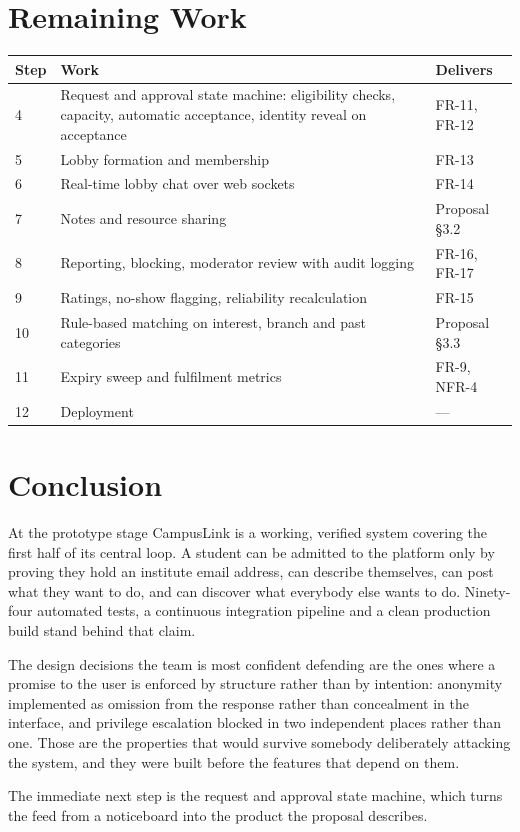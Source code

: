 \documentclass[twoside,12pt]{tietreport}
\begin{document}
\chapter{Remaining Work}

\begin{longtable}{@{}p{1.5cm}p{7.4cm}p{4.4cm}@{}}
\toprule
\textbf{Step} & \textbf{Work} & \textbf{Delivers} \\
\midrule
\endhead
4 & Request and approval state machine: eligibility checks, capacity, automatic
    acceptance, identity reveal on acceptance & FR-11, FR-12 \\
5 & Lobby formation and membership & FR-13 \\
6 & Real-time lobby chat over web sockets & FR-14 \\
7 & Notes and resource sharing & Proposal \S3.2 \\
8 & Reporting, blocking, moderator review with audit logging & FR-16, FR-17 \\
9 & Ratings, no-show flagging, reliability recalculation & FR-15 \\
10 & Rule-based matching on interest, branch and past categories & Proposal \S3.3 \\
11 & Expiry sweep and fulfilment metrics & FR-9, NFR-4 \\
12 & Deployment & --- \\
\bottomrule
\end{longtable}

\chapter{Conclusion}

At the prototype stage CampusLink is a working, verified system covering the
first half of its central loop. A student can be admitted to the platform only by
proving they hold an institute email address, can describe themselves, can post
what they want to do, and can discover what everybody else wants to do. Ninety-four
automated tests, a continuous integration pipeline and a clean production build
stand behind that claim.

The design decisions the team is most confident defending are the ones where a
promise to the user is enforced by structure rather than by intention: anonymity
implemented as omission from the response rather than concealment in the
interface, and privilege escalation blocked in two independent places rather
than one. Those are the properties that would survive somebody deliberately
attacking the system, and they were built before the features that depend on
them.

The immediate next step is the request and approval state machine, which turns
the feed from a noticeboard into the product the proposal describes.
\end{document}
